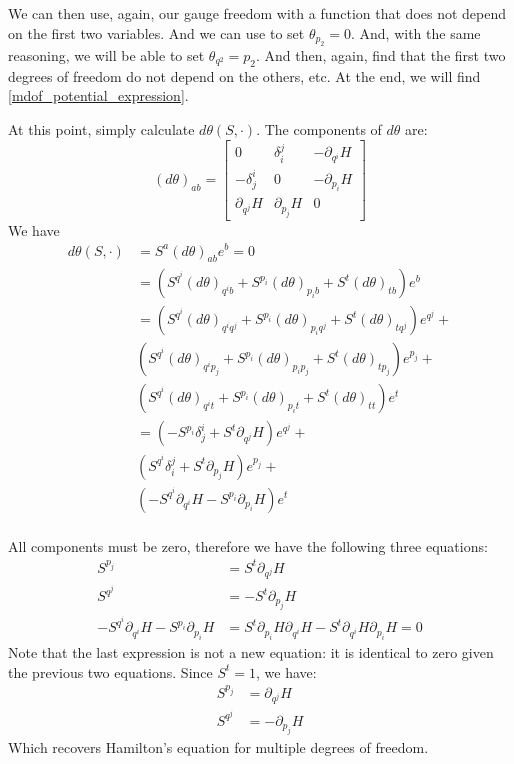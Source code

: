 \documentclass[10pt,twocolumn, nofootinbib]{revtex4-2}
\begin{document}
We can then use, again, our gauge freedom with a function that does not depend on the first two variables. And we can use to set $\theta_{p_2} = 0$. And, with the same reasoning, we will be able to set $\theta_{q^2} = p_2$. And then, again, find that the first two degrees of freedom do not depend on the others, etc. At the end, we will find \ref{mdof_potential_expression}.

At this point, simply calculate $d\theta(S, \cdot ) $. The components of $d\theta$ are:
\begin{equation*}
	(d\theta)_{ab} = \begin{bmatrix}
		0 & \delta^j_i & - \partial_{q^i} H \\
		-\delta^i_j & 0 & - \partial_{p_i} H \\
		\partial_{q^j} H & \partial_{p_j} H & 0
	\end{bmatrix}
\end{equation*}
We have
\begin{align*}
	d\theta(S, \cdot )  &= S^a (d\theta)_{ab} e^b = 0 \\
	&= (S^{q^i}(d\theta)_{q^ib} + S^{p_i}(d\theta)_{p_ib} + S^{t}(d\theta)_{tb}) e^b \\
	&= (S^{q^i}(d\theta)_{q^iq^j} + S^{p_i}(d\theta)_{p_iq^j} + S^{t}(d\theta)_{tq^j}) e^{q^j} + \\
	& (S^{q^i}(d\theta)_{q^ip_j} +  S^{p_i}(d\theta)_{p_ip_j} + S^{t}(d\theta)_{tp_j}) e^{p_j} + \\
	& (S^{q^i}(d\theta)_{q^it} + S^{p_i}(d\theta)_{p_it} + S^{t}(d\theta)_{tt}) e^t \\
	&= (-S^{p_i}\delta^i_j + S^{t}\partial_{q^j} H ) e^{q^j} + \\
	& (S^{q^i}\delta^j_i +  S^{t}\partial_{p_j} H) e^{p_j} + \\
	& (-S^{q^i} \partial_{q^i} H - S^{p_i} \partial_{p_i} H) e^t \\
\end{align*}

All components must be zero, therefore we have the following three equations:
\begin{align*}
	S^{p_j} &= S^{t} \partial_{q^j} H \\
	S^{q^j} &= - S^{t}\partial_{p_j} H \\
	-S^{q^i} \partial_{q^i} H - S^{p_i} \partial_{p_i} H &= S^{t}\partial_{p_i} H \partial_{q^i} H - S^{t} \partial_{q^i} H \partial_{p_i} H = 0
\end{align*}
Note that the last expression is not a new equation: it is identical to zero given the previous two equations. Since $S^t = 1$, we have:
\begin{align*}
	S^{p_j} &= \partial_{q^j} H \\
	S^{q^j} &= - \partial_{p_j} H
\end{align*}
Which recovers Hamilton's equation for multiple degrees of freedom.
\end{document}
